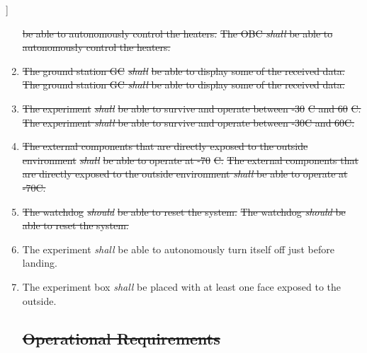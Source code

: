 ]\documentclass[a4paper,12pt,twoside]{article}
\providecommand{\DIFaddtex}[1]{{\protect\color{blue}\uwave{#1}}} %
\providecommand{\DIFdeltex}[1]{{\protect\color{red}\sout{#1}}}                      %
\providecommand{\DIFaddbegin}{} %
\providecommand{\DIFaddend}{} %
\providecommand{\DIFdelbegin}{} %
\providecommand{\DIFdelend}{} %
\providecommand{\DIFadd}[1]{\texorpdfstring{\DIFaddtex{#1}}{#1}} %
\providecommand{\DIFdel}[1]{\texorpdfstring{\DIFdeltex{#1}}{}} %
\newcommand{\DIFscaledelfig}{0.5}
\newlength{\DIFdelgraphicswidth} %
\newlength{\DIFdelgraphicsheight} %
\newcommand{\DIFaddincludegraphics}[2][]{{\color{blue}\fbox{\DIFOincludegraphics[#1]{#2}}}} %
\newcommand{\DIFdelincludegraphics}[2][]{%
\sbox{\DIFdelgraphicsbox}{\DIFOincludegraphics[#1]{#2}}%
\settoboxwidth{\DIFdelgraphicswidth}{\DIFdelgraphicsbox} %
\settoboxtotalheight{\DIFdelgraphicsheight}{\DIFdelgraphicsbox} %
\scalebox{\DIFscaledelfig}{%
\parbox[b]{\DIFdelgraphicswidth}{\usebox{\DIFdelgraphicsbox}\\[-\baselineskip] \rule{\DIFdelgraphicswidth}{0em}}\llap{\resizebox{\DIFdelgraphicswidth}{\DIFdelgraphicsheight}{%
\setlength{\unitlength}{\DIFdelgraphicswidth}%
\begin{picture}(1,1)%
\thicklines\linethickness{2pt} %
{\color[rgb]{1,0,0}\put(0,0){\framebox(1,1){}}}%
{\color[rgb]{1,0,0}\put(0,0){\line( 1,1){1}}}%
{\color[rgb]{1,0,0}\put(0,1){\line(1,-1){1}}}%
\end{picture}%
}\hspace*{3pt}}} %
} %
\DeclareRobustCommand{\DIFaddbegin}{\DIFOaddbegin \let\includegraphics\DIFaddincludegraphics} %
\DeclareRobustCommand{\DIFaddend}{\DIFOaddend \let\includegraphics\DIFOincludegraphics} %
\DeclareRobustCommand{\DIFdelbegin}{\DIFOdelbegin \let\includegraphics\DIFdelincludegraphics} %
\DeclareRobustCommand{\DIFdelend}{\DIFOaddend \let\includegraphics\DIFOincludegraphics} %
\begin{document}
\begin{enumerate}[label=D.\arabic*]
\DIFdel{be able to autonomously control the heaters.
    }\DIFdelend \DIFaddbegin \st{The OBC \textit{shall} be able to autonomously control the heaters.}\DIFadd{\textsuperscript{\ref{fn:unnecessary-requirement}}
    }\DIFaddend \item \DIFdelbegin \DIFdel{The ground station GC }\textit{\DIFdel{shall}} %
\DIFdel{be able to display some of the received data.
    }\DIFdelend \DIFaddbegin \st{The ground station GC \textit{shall} be able to display some of the received data.}\DIFadd{\textsuperscript{\ref{fn:unnecessary-requirement}}
    }\DIFaddend \item \DIFdelbegin \DIFdel{The experiment }\textit{\DIFdel{shall}} %
\DIFdel{be able to survive and operate between -30}%
\DIFdel{C and 60}%
\DIFdel{C.
    }\DIFdelend \DIFaddbegin \st{The experiment \textit{shall} be able to survive and operate between -30\degree C and 60\degree C.}\DIFadd{\textsuperscript{\ref{fn:unnecessary-requirement}}
    }\DIFaddend \item \DIFdelbegin \DIFdel{The external components that are directly exposed to the outside environment }\textit{\DIFdel{shall}} %
\DIFdel{be able to operate at -70}%
\DIFdel{C.
    }\DIFdelend \DIFaddbegin \st{The external components that are directly exposed to the outside environment \textit{shall} be able to operate at -70\degree C.}\DIFadd{\textsuperscript{\ref{fn:unnecessary-requirement}}
    }\DIFaddend \item \DIFdelbegin \DIFdel{The watchdog }\textit{\DIFdel{should}} %
\DIFdel{be able to reset the system.
    }\DIFdelend \DIFaddbegin \st{The watchdog \textit{should} be able to reset the system.}\DIFadd{\textsuperscript{\ref{fn:unnecessary-requirement}}
    }\DIFaddend \item The experiment \textit{shall} be able to autonomously turn itself off just before landing.
    \item The experiment box \textit{shall} be placed with at least one face exposed to the outside.
    \DIFdelbegin %
\subsection{\DIFdel{Operational Requirements}}
\addtocounter{subsection}{-1}%


\end{enumerate}
\end{document}
